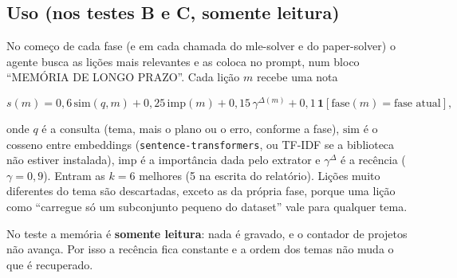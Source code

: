 \documentclass[11pt,a4paper]{article}
\begin{document}
\subsection{Uso (nos testes B e C, somente leitura)}

No começo de cada fase (e em cada chamada do mle-solver e do paper-solver) o agente busca
as lições mais relevantes e as coloca no prompt, num bloco ``MEMÓRIA DE LONGO PRAZO''. Cada
lição $m$ recebe uma nota

\[
  s(m) = 0{,}6\,\mathrm{sim}(q, m) + 0{,}25\,\mathrm{imp}(m) + 0{,}15\,\gamma^{\Delta(m)}
       + 0{,}1\,\mathbf{1}[\text{fase}(m) = \text{fase atual}],
\]

onde $q$ é a consulta (tema, mais o plano ou o erro, conforme a fase), $\mathrm{sim}$ é o
cosseno entre embeddings (\texttt{sentence-transformers}, ou TF-IDF se a biblioteca não
estiver instalada), $\mathrm{imp}$ é a importância dada pelo extrator e
$\gamma^{\Delta} $ é a recência ($\gamma = 0{,}9$). Entram as $k = 6$ melhores (5 na escrita
do relatório). Lições muito diferentes do tema são descartadas, exceto as da própria fase,
porque uma lição como ``carregue só um subconjunto pequeno do dataset'' vale para qualquer
tema.

No teste a memória é \textbf{somente leitura}: nada é gravado, e o contador de projetos não
avança. Por isso a recência fica constante e a ordem dos temas não muda o que é recuperado.
\end{document}
